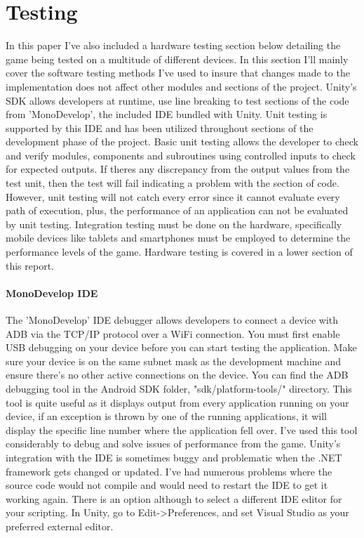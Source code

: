 \section{Testing}
In this paper I've also included a hardware testing section below detailing the game being tested on a multitude of different devices. In this section I'll mainly cover the software testing methods I've used to insure that changes made to the implementation does not affect other modules and sections of the project.
Unity's SDK allows developers at runtime, use line breaking to test sections of the code from 'MonoDevelop', the included IDE bundled with Unity. Unit testing is supported by this IDE and has been utilized throughout sections of the development phase of the project. Basic unit testing allows the developer to check and verify modules, components and subroutines using controlled inputs to check for expected outputs. If theres any discrepancy from the output values from the test unit, then the test will fail indicating a problem with the section of code. However, unit testing will not catch every error since it cannot evaluate every path of execution, plus, the performance of an application can not be evaluated by unit testing. Integration testing must be done on the hardware, specifically mobile devices like tablets and smartphones must be employed to determine the performance levels of the game. Hardware testing is covered in a lower section of this report.
\paragraph{MonoDevelop IDE}
The 'MonoDevelop' IDE debugger allows developers to connect a device with ADB via the TCP/IP protocol over a WiFi connection. You must first enable USB debugging on your device before you can start testing the application. Make sure your device is on the same subnet mask as the development machine and ensure there's no other active connections on the device. You can find the ADB debugging tool in the Android SDK folder, "sdk/platform-tools/" directory. This tool is quite useful as it displays output from every application running on your device, if an exception is thrown by one of the running applications, it will display the specific line number where the application fell over. I've used this tool considerably to debug and solve issues of performance from the game. Unity's integration with the IDE is sometimes buggy and problematic when the .NET framework gets changed or updated. I've had numerous problems where the source code would not compile and would need to restart the IDE to get it working again. There is an option although to select a different IDE editor for your scripting. In Unity, go to Edit->Preferences, and set Visual Studio as your preferred external editor.
